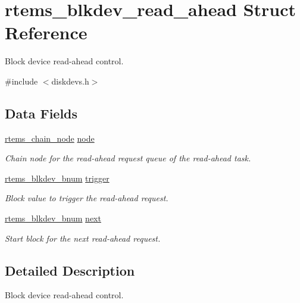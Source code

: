 \hypertarget{structrtems__blkdev__read__ahead}{}\section{rtems\+\_\+blkdev\+\_\+read\+\_\+ahead Struct Reference}
\label{structrtems__blkdev__read__ahead}


Block device read-\/ahead control.  




{\ttfamily \#include $<$diskdevs.\+h$>$}

\subsection*{Data Fields}
\begin{DoxyCompactItemize}
\item 
\mbox{\label{structrtems__blkdev__read__ahead_a065e7a674ec008686aaa502f1eb92735}} 
\mbox{\hyperlink{structChain__Node__struct}{rtems\+\_\+chain\+\_\+node}} \mbox{\hyperlink{structrtems__blkdev__read__ahead_a065e7a674ec008686aaa502f1eb92735}{node}}
\begin{DoxyCompactList}\small\item\em Chain node for the read-\/ahead request queue of the read-\/ahead task. \end{DoxyCompactList}\item 
\mbox{\hyperlink{group__rtems__disk_ga5fbcfd40b657bff6c54d9e393fab3274}{rtems\+\_\+blkdev\+\_\+bnum}} \mbox{\hyperlink{structrtems__blkdev__read__ahead_a6765fdf41740817fe7116e198ca3e59b}{trigger}}
\begin{DoxyCompactList}\small\item\em Block value to trigger the read-\/ahead request. \end{DoxyCompactList}\item 
\mbox{\hyperlink{group__rtems__disk_ga5fbcfd40b657bff6c54d9e393fab3274}{rtems\+\_\+blkdev\+\_\+bnum}} \mbox{\hyperlink{structrtems__blkdev__read__ahead_a3c9b04526854c11a902d6f4865c19b11}{next}}
\begin{DoxyCompactList}\small\item\em Start block for the next read-\/ahead request. \end{DoxyCompactList}\end{DoxyCompactItemize}


\subsection{Detailed Description}
Block device read-\/ahead control. 

